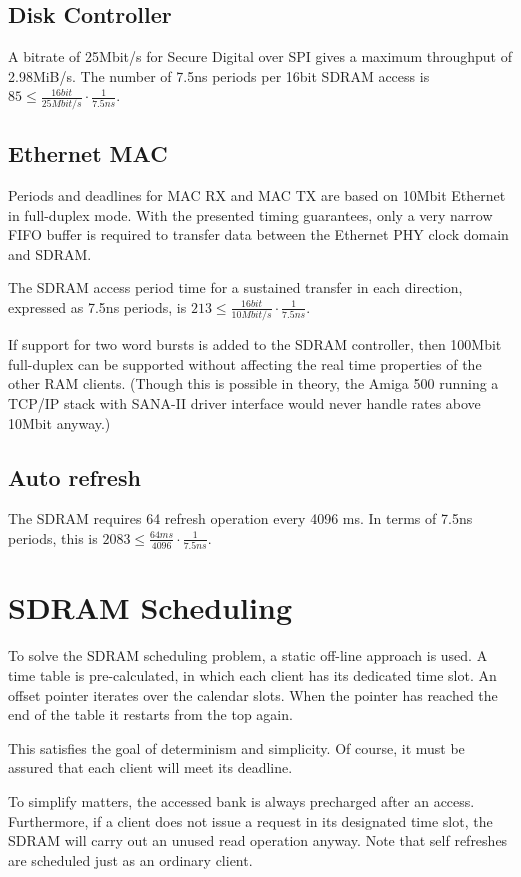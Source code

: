 \documentclass[a4paper]{report}
\begin{document}
\subsection{Disk Controller}
A bitrate of 25Mbit/s for Secure Digital over SPI gives a
maximum throughput of 2.98MiB/s. The number of 7.5ns periods
per 16bit SDRAM access is
$85 \le \frac{16 bit}{25 Mbit/s}\cdot \frac{1}{7.5 ns}$.

\subsection{Ethernet MAC}
Periods and deadlines for MAC RX and MAC TX are based on
\si{10}{Mbit} Ethernet in full-duplex mode. With the presented
timing guarantees, only a very narrow FIFO buffer is required
to transfer data between the Ethernet PHY clock domain and
SDRAM. 

The SDRAM access period time for a sustained transfer in each
direction, expressed as 7.5ns periods, is
$213 \le \frac{16 bit}{10 Mbit/s}\cdot \frac{1}{7.5 ns}$.

If support for two word bursts is added to the SDRAM
controller, then \si{100}{Mbit} full-duplex can be supported
without affecting the real time properties of the other RAM
clients. (Though this is possible in theory, the Amiga 500 running
a TCP/IP stack with SANA-II driver interface would never handle
rates above \si{10}{Mbit} anyway.)

\subsection{Auto refresh}
The SDRAM requires 64 refresh operation every 4096 ms. In terms
of 7.5ns periods, this is
$2083 \le \frac{64 ms}{4096}\cdot \frac{1}{7.5 ns}$.

\section{SDRAM Scheduling}
To solve the SDRAM scheduling problem, a static off-line
approach is used. A time table is pre-calculated, in which
each client has its dedicated time slot. An offset pointer
iterates over the calendar slots. When the pointer has reached
the end of the table it restarts from the top again.

This satisfies the goal of determinism and simplicity. Of
course, it must be assured that each client will meet its deadline.

To simplify matters, the accessed bank is always precharged
after an access. Furthermore, if a client does not issue a
request in its designated time slot, the SDRAM will carry out
an unused read operation anyway.  Note that self refreshes
are scheduled just as an ordinary client.
\end{document}
